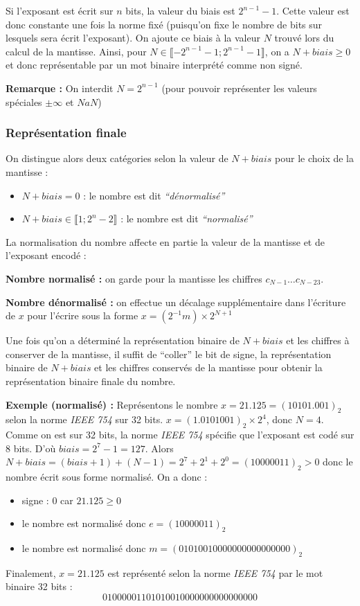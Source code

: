 \documentclass[../../main.tex]{subfiles}
\begin{document}
Si l'exposant est écrit sur $n$ bits, la valeur du biais est $2^{n-1} - 1$. Cette valeur est donc constante une fois la norme fixé (puisqu'on fixe le nombre de bits sur lesquels sera écrit l'exposant). On ajoute ce biais à la valeur $N$ trouvé lors du calcul de la mantisse. Ainsi, pour $N\in{\llbracket -2^{n-1} - 1; 2^{n-1}-1\rrbracket}$, on a $N + biais \geq{0}$ et donc représentable par un mot binaire interprété comme non signé.

\textbf{Remarque :} On interdit $N = 2^{n-1}$ (pour pouvoir représenter les valeurs spéciales $\pm\infty$ et $NaN$)

\subsubsection{Représentation finale} \label{ssub:repr_sentation_finale}
On distingue alors deux catégories selon la valeur de $N + biais$ pour le choix de la mantisse :
\begin{itemize}
     \item $N + biais = 0$ : le nombre est dit \textit{``dénormalisé''}
     \item $N + biais \in{\llbracket{1; 2^{n}-2\rrbracket}}$ : le nombre est dit \textit{``normalisé''}
\end{itemize}
La normalisation du nombre affecte en partie la valeur de la mantisse et de l'exposant encodé :

\textbf{Nombre normalisé :} on garde pour la mantisse les chiffres $c_{N-1}\dots c_{N-23}$.

\textbf{Nombre dénormalisé :} on effectue un décalage supplémentaire dans l'écriture de $x$ pour l'écrire sous la forme $x = (2^{-1}m)\times{2^{N + 1}}$

Une fois qu'on a déterminé la représentation binaire de $N + biais$ et les chiffres à conserver de la mantisse, il suffit de ``coller'' le bit de signe, la représentation binaire de $N + biais$ et les chiffres conservés de la mantisse pour obtenir la représentation binaire finale du nombre.

\textbf{Exemple (normalisé) : } Représentons le nombre $x = 21.125 = (10101.001)_{2}$ selon la norme \textit{IEEE 754} sur 32 bits. \newline
$x = (1.0101001)_{2}\times{2^{4}}$, donc $N = 4$. Comme on est sur 32 bits, la norme \textit{IEEE 754} spécifie que l'exposant est codé sur 8 bits. D'où $biais = 2^{7}-1 = 127$. Alors $N + biais =  (biais + 1) + (N-1) = 2^{7} + 2^{1} + 2^{0} = (10000011)_{2} > 0$ donc le nombre écrit sous forme normalisé. On a donc :
\begin{itemize}
     \item signe : 0 car $21.125 \geq 0$
     \item le nombre est normalisé donc $e = (10000011)_{2}$
     \item le nombre est normalisé donc $m = (01010010000000000000000)_{2}$
\end{itemize}
Finalement, $x = 21.125$ est représenté selon la norme \textit{IEEE 754} par le mot binaire 32 bits : $$01000001101010010000000000000000$$
\end{document}
